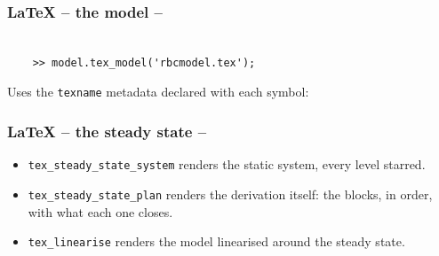 \documentclass[10pt,slidestop]{beamer}
\theoremstyle{plain}
\begin{document}

\begin{frame}[c,fragile]
  \frametitle{LaTeX -- the model --}

  \begin{lstlisting}[style=MatlabConsole]

    >> model.tex_model('rbcmodel.tex');
  \end{lstlisting}

  \medskip

  Uses the \verb+texname+ metadata declared with each symbol:

  \medskip


\end{frame}


\begin{frame}[c,fragile]
  \frametitle{LaTeX -- the steady state --}

  \begin{itemize}

  \item \verb+tex_steady_state_system+ renders the static system, every level
    starred.\newline

  \item \verb+tex_steady_state_plan+ renders the derivation itself: the blocks,
    in order, with what each one closes.\newline

  \item \verb+tex_linearise+ renders the model linearised around the steady
    state.

  \end{itemize}

  \medskip


\end{frame}
\end{document}
